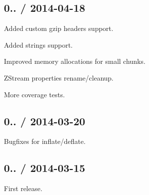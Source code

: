\subsection*{0.. / 2014-\/04-\/18 }


\begin{DoxyItemize}
\item Added custom gzip headers support.
\item Added strings support.
\item Improved memory allocations for small chunks.
\item Z\+Stream properties rename/cleanup.
\item More coverage tests.
\end{DoxyItemize}

\subsection*{0.. / 2014-\/03-\/20 }


\begin{DoxyItemize}
\item Bugfixes for inflate/deflate.
\end{DoxyItemize}

\subsection*{0.. / 2014-\/03-\/15 }


\begin{DoxyItemize}
\item First release. 
\end{DoxyItemize}
